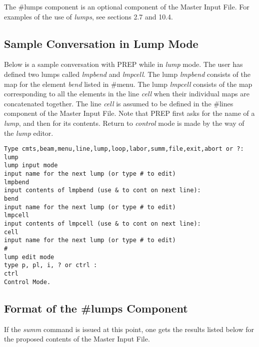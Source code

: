 The \#lumps component is an optional component of the Master Input File.
For examples of the use of {\em lumps}, see sections 2.7 and 10.4.

\subsection{Sample Conversation in Lump Mode} Below is a sample
conversation with PREP while in {\em lump} mode. The user has defined two
lumps called {\em lmpbend} and {\em lmpcell}. The lump {\em lmpbend}
consists of the map for the element {\em bend} listed in \#menu. The lump
{\em lmpcell} consists of the map corresponding to all the elements in the
line {\em cell} when their individual maps are concatenated together. The
line {\em cell} is assumed to be defined in the \#lines component of the
Master Input File. Note that PREP first asks for the name of a {\em lump},
and then for its contents. Return to {\em control} mode is made by the way
of the {\em lump} editor.

\begin{footnotesize}
\begin{verbatim}
Type cmts,beam,menu,line,lump,loop,labor,summ,file,exit,abort or ?:
lump
lump input mode
input name for the next lump (or type # to edit)
lmpbend
input contents of lmpbend (use & to cont on next line):
bend
input name for the next lump (or type # to edit)
lmpcell
input contents of lmpcell (use & to cont on next line):
cell
input name for the next lump (or type # to edit)
#
lump edit mode
type p, pl, i, ? or ctrl :
ctrl
Control Mode.
\end{verbatim}
\end{footnotesize}

\subsection{Format of the \#lumps Component} If the {\em summ} command is
issued at this point, one gets the results listed below for the proposed
contents of the Master Input File.

